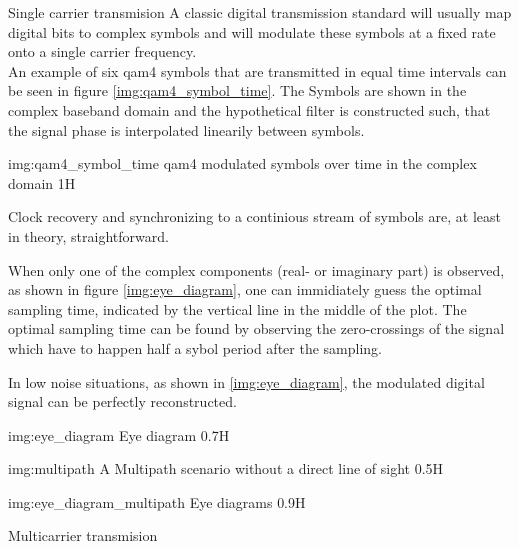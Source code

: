 \begin{subchapter}{Single carrier transmision}
  A classic digital transmission standard will usually map
  digital bits to complex symbols and will modulate these
  symbols at a fixed rate onto a single carrier frequency. \\

  An example of six \acrshort{qam4} symbols that are transmitted
  in equal time intervals can be seen in figure \ref{img:qam4_symbol_time}.
  The Symbols are shown in the complex baseband domain and the
  hypothetical filter is constructed such, that the signal
  phase is interpolated linearily between symbols.

               {img:qam4_symbol_time}
               {\acrshort{qam4} modulated symbols over time in the complex domain}
               {1}{H}

  Clock recovery and synchronizing to a continious stream of
  symbols are, at least in theory, straightforward.

  When only one of the complex components (real- or imaginary part)
  is observed, as shown in figure \ref{img:eye_diagram}, one can
  immidiately guess the optimal sampling time, indicated by the
  vertical line in the middle of the plot.
  The optimal sampling time can be found by observing the
  zero-crossings of the signal which have to happen half a
  sybol period after the sampling.

  In low noise situations, as shown in \ref{img:eye_diagram},
  the modulated digital signal can be perfectly reconstructed.

                  {img:eye_diagram}
                  {Eye diagram}
                  {0.7}{H}



               {img:multipath}
               {A Multipath scenario without a direct line of sight}
               {0.5}{H}

               {img:eye_diagram_multipath}
               {Eye diagrams}
               {0.9}{H}


\end{subchapter}

\begin{subchapter}{Multicarrier transmision}

\end{subchapter}
